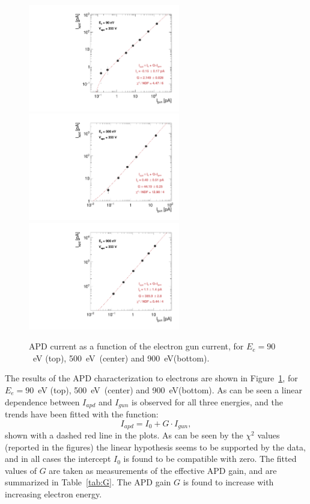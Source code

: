 \documentclass[12p]{paper}
\begin{document}
\begin{figure}[p]
  \centering
  \includegraphics[width=0.59\textwidth]{figures/iapd_vs_igun_E90_V350}
  \includegraphics[width=0.59\textwidth]{figures/iapd_vs_igun_E500_V350}
  \includegraphics[width=0.59\textwidth]{figures/iapd_vs_igun_E900_V350}
 \caption{APD current as a function of the electron gun current, for $E_{e} = 90$~eV (top), 500~eV~(center) and 900~eV(bottom).
  \label{fig:i_vs_i}}
\end{figure}

The results of the APD characterization to electrons are shown in Figure~\ref{fig:i_vs_i}, for $E_{e} = 90$~eV (top), 500~eV~(center) and 900~eV(bottom). As can be seen a linear dependence between $I_{apd}$ and $I_{gun}$ is observed for all three energies, and the trends have been fitted with the function:
$$
I_{apd} = I_0 + G\cdot I_{gun},
$$
shown with a dashed red line in the plots. As can be seen by the $\chi^2$ values (reported in the figures) the linear hypothesis seems to be supported by the data, and in all cases the intercept $I_0$ is found to be compatible with zero. The fitted values of $G$ are taken as measurements of the effective APD gain, and are summarized in Table~\ref{tab:G}. The APD gain $G$ is found to increase with increasing electron energy.
\end{document}
